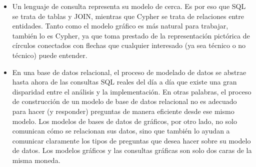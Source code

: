 \begin{itemize}
    \item Un lenguaje de consulta representa su modelo de cerca. Es por eso que SQL se trata de tablas y JOIN, mientras que Cypher se trata de relaciones entre entidades. Tanto como el modelo gráfico es más natural para trabajar, también lo es Cypher, ya que toma prestado de la representación pictórica de círculos conectados con flechas que cualquier interesado (ya sea técnico o no técnico) puede entender.
    \item En una base de datos relacional, el proceso de modelado de datos se abstrae hasta ahora de las consultas SQL reales del día a día que existe una gran disparidad entre el análisis y la implementación. En otras palabras, el proceso de construcción de un modelo de base de datos relacional no es adecuado para hacer (y responder) preguntas de manera eficiente desde ese mismo modelo.
    Los modelos de bases de datos de gráficos, por otro lado, no solo comunican cómo se relacionan sus datos, sino que también lo ayudan a comunicar claramente los tipos de preguntas que desea hacer sobre su modelo de datos. Los modelos gráficos y las consultas gráficas son solo dos caras de la misma moneda.

\end{itemize}